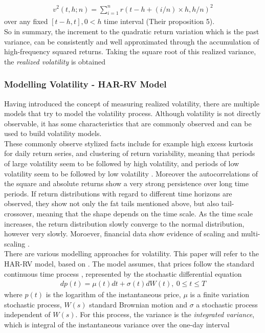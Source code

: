 \begin{align}\label{eq:RV-andersen}
v^2(t,h;n) = \sum_{i=1}^{n} r(t-h+(i/n) \times h,h/n)^2
\end{align}
over any fixed $[t-h,t], 0 < h$ time interval (Their proposition 5).\\
So in summary, the increment to the quadratic return variation which is the past variance, can be consistently and well approximated through the accumulation of high-frequency squared returns. Taking the square root of this realized variance, the \emph{realized volatility} is obtained


\subsubsection{Modelling Volatility - HAR-RV Model}\label{sec:222HAR-RV}
Having introduced the concept of measuring realized volatility, there are multiple models that try to model the volatility process. Although volatility is not directly observable, it has some characteristics that are commonly observed and can be used to build volatility models. \\
These commonly observe stylized facts include for example high excess kurtosis for daily return series, and clustering of return variability, meaning that periods of large volatility seem to be followed by high volatility, and periods of low volatility seem to be followed by low volatility \parencite{tsay2005}. Moreover the autocorrelations of the square and absolute returns show a very strong persistence over long time periods. If return distributions with regard to different time horizons are observed, they show not only the fat tails mentioned above, but also tail-crossover, meaning that the shape depends on the time scale. As the time scale increases, the return distribution slowly converge to the normal distribution, however very slowly. Moroever, financial data show evidence of scaling and multi-scaling \textcite{corsi2009}. \\
There are various modelling approaches for volatility. This paper will refer to the HAR-RV model, based on \textcite{corsi2009}. The model assumes, that prices follow the standard continuous time process , represented by the stochastic differential equation
\begin{align}\label{eq:return-process-corsi}
dp(t) = \mu(t)dt + \sigma(t)dW(t), \ 0 \leq t \leq T
\end{align}
where $p(t)$ is the logarithm of the instantaneous price, $\mu$ is a finite variation stochastic process, $W(s)$ standard Brownian motion and $\sigma$ a stochastic process independent of $W(s)$. For this process, the variance is the \emph{integrated variance}, which is integral of the instantaneous variance over the one-day interval
